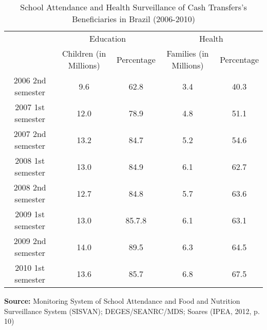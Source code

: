 \documentclass[12pt,a4paper]{article}
\begin{document}

\begin{table}[htbp]
	\centering
	\caption{School Attendance and Health Surveillance of Cash Transfers's Beneficiaries in Brazil (2006-2010)\label{School}}
\begin{tabular}{ccccc}
 \hline\hline
 & \multicolumn{2}{c}{Education} & \multicolumn{2}{c}{Health} \\
 \cmidrule(r){2-3} \cmidrule(r){4-5}
 & Children (in Millions) & Percentage & Families (in Millions) & Percentage \\
 \hline
 2006 2nd semester & 9.6 & 62.8 & 3.4 & 40.3\\
 2007 1st semester & 12.0 & 78.9 & 4.8 & 51.1\\
 2007 2nd semester & 13.2 & 84.7 & 5.2 & 54.6\\
 2008 1st semester & 13.0 & 84.9 & 6.1 & 62.7\\
 2008 2nd semester & 12.7 & 84.8 & 5.7 & 63.6\\
 2009 1st semester & 13.0 & 85.7.8 & 6.1 & 63.1\\
 2009 2nd semester & 14.0 & 89.5 & 6.3 & 64.5\\
 2010 1st semester & 13.6 & 85.7 & 6.8 & 67.5\\
 \hline
\end{tabular}
\begin{flushleft} 
\scriptsize\textbf{Source:} {Monitoring System of School Attendance and Food and Nutrition Surveillance System (SISVAN); DEGES/SEANRC/MDS; Soares (IPEA, 2012, p. 10)}\\
\end{flushleft}
\end{table}

\end{document}
